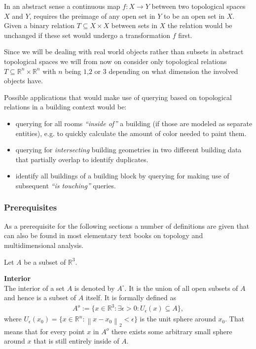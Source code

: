 \documentclass[paper=a4, fontsize=11pt]{scrartcl} %
\newcommand{\norm}[1]{\left\lVert#1\right\rVert}
\numberwithin{equation}{section} %
\numberwithin{figure}{section} %
\numberwithin{table}{section} %
\begin{document}
In an abstract sense a continuous map $f:X \rightarrow Y$ between two topological spaces $X$ and $Y$, requires the preimage of any open set in $Y$ to be an open set in $X$. Given a binary relation $T\subseteq X\times X$ between sets in $X$ the relation would be unchanged if these set would undergo a transformation $f$ first.

Since we will be dealing with real world objects rather than subsets in abstract topological spaces we will from now on consider only topological relations $T\subseteq \mathbb{R}^n \times \mathbb{R}^n$ with $n$ being $1$,$2$ or $3$ depending on what dimension the involved objects have.

Possible applications that would make use of querying based on topological relations in a building context would be:
\begin{itemize}
\item querying for all rooms \emph{``inside of''} a building (if those are modeled as separate entities), e.g. to quickly calculate the amount of color needed to paint them.
\item querying for \emph{intersecting} building geometries in two different building data that partially overlap to identify duplicates.
\item identify all buildings of a building block by querying for making use of subsequent \emph{``is touching''} queries.
\end{itemize}

\subsubsection{Prerequisites}\label{sec:prerequisites-1}
As a prerequisite for the following sections a number of definitions are given that can also be found in most elementary text books on topology and multidimensional analysis.

Let $A$ be a subset of $\mathbb{R}^3$.


\textbf{Interior}\\
The interior of a set $A$ is denoted by $A^{\circ}$. It is the union of all open subsets of $A$ and hence is a subset of $A$ itself. It is formally defined as
\begin{align*}
  A^o := \{ x\in \mathbb{R}^3  : \exists \epsilon > 0 : U_{\epsilon}(x) \subseteq A \},
\end{align*}
where $U_{\epsilon}(x_0) = \{ x \in \mathbb{R}^n : \norm{x-x_0}_2< \epsilon \}$ is the unit sphere around $x_0$. 
That means that for every point $x$ in $A^o$ there exists some arbitrary small sphere around $x$ that is still entirely inside of $A$. 
\end{document}
